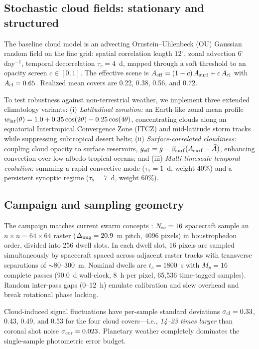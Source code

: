 \documentclass[twocolumn]{emulateapj}
\begin{document}
\subsection{Stochastic cloud fields: stationary and structured}
The baseline cloud model is an advecting Ornstein--Uhlenbeck (OU) Gaussian
random field on the fine grid: spatial correlation length $12^\circ$,
zonal advection $6^\circ$\,day$^{-1}$, temporal decorrelation $\tau_c=4$~d,
mapped through a soft threshold to an opacity screen $c\in[0,1]$. The
effective scene is $A_{\rm eff}=(1-c)\,A_{\rm surf}+c\,A_{\rm cl}$ with
$A_{\rm cl}=0.65$. Realized mean covers are 0.22, 0.38, 0.56, and 0.72.

To test robustness against non-terrestrial weather, we implement three
extended climatology variants:
(i) {\it Latitudinal zonation:} an Earth-like zonal mean profile
$w_{\rm lat}(\theta)=1.0+0.35\cos(2\theta)-0.25\cos(4\theta)$, concentrating
clouds along an equatorial Intertropical Convergence Zone (ITCZ) and
mid-latitude storm tracks while suppressing subtropical desert belts;
(ii) {\it Surface-correlated cloudiness:} coupling cloud opacity to surface
reservoirs, $g_{\rm eff}=g-\beta_{\rm surf}(A_{\rm surf}-\bar{A})$, enhancing
convection over low-albedo tropical oceans; and
(iii) {\it Multi-timescale temporal evolution:} summing a rapid convective
mode ($\tau_1=1$~d, weight 40\%) and a persistent synoptic regime
($\tau_2=7$~d, weight 60\%).

\subsection{Campaign and sampling geometry}
The campaign matches current swarm concepts \citep{tt22mnras,helvajian23}:
$N_{\rm sc}=16$ spacecraft sample an $n\times n=64\times64$ raster
($\Delta_{\rm img}=20.9$~m pitch, 4096 pixels) in boustrophedon order,
divided into 256 dwell slots. In each dwell slot, 16 pixels are sampled
simultaneously by spacecraft spaced across adjacent raster tracks with
transverse separations of $\sim$80--300~m. Nominal dwells are $t_s=1800$~s
with $M_p=16$ complete passes (90.0~d wall-clock, 8~h per pixel, 65,536
time-tagged samples). Random inter-pass gaps (0--12~h) emulate calibration
and slew overhead and break rotational phase locking.

Cloud-induced signal fluctuations have per-sample standard deviations
$\sigma_{\rm cl}=0.33$, 0.43, 0.49, and 0.53 for the four cloud covers---i.e.,
{\it 14--23 times larger} than coronal shot noise $\sigma_{\rm cor}=0.023$.
Planetary weather completely dominates the single-sample photometric error budget.
\end{document}
